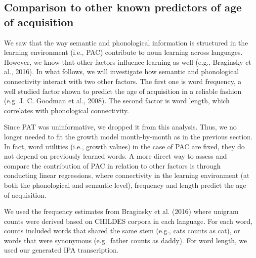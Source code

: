\documentclass[10pt, letterpaper]{article}
\begin{document}
\subsection{Comparison to other known predictors of age of
acquisition}\label{comparison-to-other-known-predictors-of-age-of-acquisition}

We saw that the way semantic and phonological information is structured
in the learning environment (i.e., PAC) contribute to noun learning
across languages. However, we know that other factors influence learning
as well (e.g., Braginsky et al., 2016). In what follows, we will
investigate how semantic and phonological connectivity interact with two
other factors. The first one is word frequency, a well studied factor
shown to predict the age of acquisition in a reliable fashion (e.g. J.
C. Goodman et al., 2008). The second factor is word length, which
correlates with phonological connectivity.

Since PAT was uninformative, we dropped it from this analysis. Thus, we
no longer needed to fit the growth model month-by-month as in the
previous section. In fact, word utilities (i.e., growth values) in the
case of PAC are fixed, they do not depend on previously learned words. A
more direct way to assess and compare the contribution of PAC in
relation to other factors is through conducting linear regressions,
where connectivity in the learning environment (at both the phonological
and semantic level), frequency and length predict the age of
acquisition.

We used the frequency estimates from Braginsky et al. (2016) where
unigram counts were derived based on CHILDES corpora in each language.
For each word, counts included words that shared the same stem (e.g.,
cats counts as cat), or words that were synonymous (e.g.~father counts
as daddy). For word length, we used our generated IPA transcription.
\end{document}
